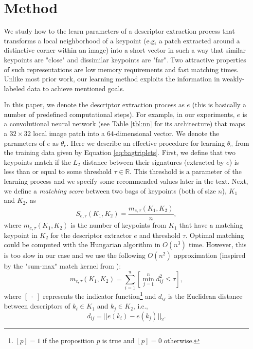 \documentclass[10pt,conference,a4paper]{IEEEtran}
\begin{document}
	\section{Method}\label{sec:core}
		We study how to the learn parameters of a descriptor extraction process that transforms a local neighborhood of a keypoint (e.g, a patch extracted around a distinctive corner within an image) into a short vector in such a way that similar keypoints are "close" and dissimilar keypoints are "far".
		Two attractive properties of such representations are low memory requirements and fast matching times.
		Unlike most prior work, our learning method exploits the information in weakly-labeled data to achieve mentioned goals.

		In this paper, we denote the descriptor extraction process as $e$ (this is basically a number of predefined computational steps).
		For example, in our experiments, $e$ is a convolutional neural network (see Table \ref{tbl:nn} for its architecture) that maps a $32\times 32$ local image patch into a $64$-dimensional vector.
		We denote the parameters of $e$ as $\theta_e$.
		Here we describe an effective procedure for learning $\theta_e$ from the training data given by Equation \eqref{eq:bagtriplets}.
		First, we define that two keypoints match if the $L_2$ distance between their signatures (extracted by $e$) is less than or equal to some threshold $\tau\in\mathbb{R}$.
		This threshold is a parameter of the learning process and we specify some recommended values later in the text.
		Next, we define a \emph{matching score} between two bags of keypoints (both of size $n$), $K_1$ and $K_2$, as
		\begin{equation}\label{eq:bagsim}
			S_{e, \tau}(K_1, K_2)=
			\frac{m_{e, \tau}(K_1, K_2)}{n}
			,
		\end{equation}
		where $m_{e, \tau}(K_1, K_2)$ is the number of keypoints from $K_1$ that have a matching keypoint in $K_2$ for the descriptor extractor $e$ and threshold $\tau$.
		Optimal matching could be computed with the Hungarian algorithm in $O(n^3)$ time.
		However, this is too slow in our case and we use the following $O(n^2)$ approximation
		(inspired by the "sum-max" match kernel from \cite{summax}):
		$$
			m_{e, \tau}(K_1, K_2)=
			\sum_{i=1}^n \left[ \min_{j=1}^n d_{ij}^2 \leq \tau \right]
			,
		$$
		where $[\;\cdot\;]$ represents the indicator function\footnote{$[p]=1$ if the proposition $p$ is true and $[p]=0$ otherwise.} and $d_{ij}$ is the Euclidean distance between descriptors of $k_i\in K_1$ and $k_j\in K_2$, i.e.,
		$$
			d_{ij} =
			|| e(k_i) - e(k_j) ||_2
			.
		$$
\end{document}
